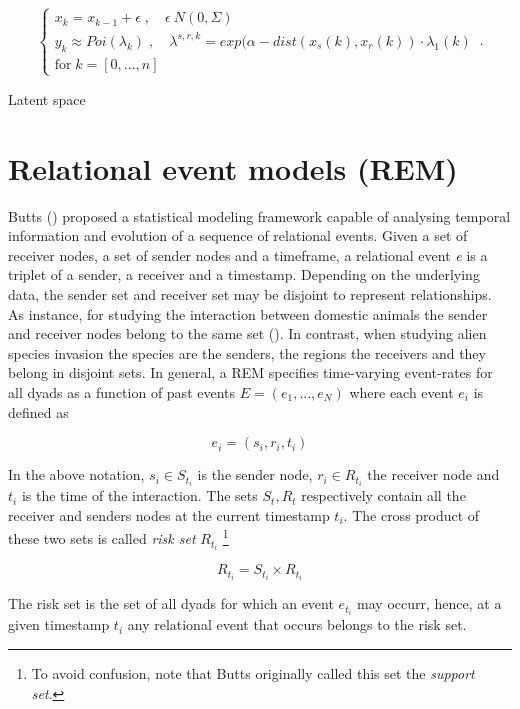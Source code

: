 \documentclass[mscthesis]{usiinfthesis}
\begin{document}
\begin{eqfloat}
\begin{equation}
    \begin{cases}
      x_k = x_{k-1} + \epsilon \; , \quad \epsilon ~ N(0, \Sigma) \\
      y_k \approx Poi(\lambda_k) \; , \quad \lambda^{s, r, k} = exp(\alpha-dist(x_s(k), x_r(k)) \cdot \lambda_1(k) \\
      \textrm{for} \; k = [0, ..., n]
    \end{cases}\,.
\label{eq:latent_randomwalk}
\end{equation}
\caption{Latent space}
\end{eqfloat}


\section{Relational event models (REM)}

Butts (\citet{rem:butts}) proposed a statistical modeling framework capable of analysing temporal information and evolution of a sequence of relational events. Given a set of receiver nodes, a set of sender nodes and a timeframe, a relational event \textit{e} is a triplet of a sender, a receiver and a timestamp. Depending on the underlying data, the sender set and receiver set may be disjoint to represent relationships. As instance, for studying the interaction between domestic animals the sender and receiver nodes belong to the same set (\citep{intro:cattle}). In contrast, when studying alien species invasion the species are the senders, the regions the receivers and they belong in disjoint sets. In general, a REM specifies time-varying event-rates for all dyads as a function of past events $E=(e_1, ..., e_N)$ where each event $e_i$ is defined as

\[
e_i = (s_i, r_i, t_i)
\]

In the above notation, $s_i \in S_{t_i} $ is the sender node, $r_i \in R_{t_i}$ the receiver node and $t_i$ is the time of the interaction. The sets $S_t, R_t$ respectively contain all the receiver and senders nodes at the current timestamp $t_i$. The cross product of these two sets is called \textit{risk set} $R_{t_i}$  \footnote{\label{riskset_footnote}To avoid confusion, note that Butts originally called this set the \textit{support set}.}



\[
R_{t_i} = S_{t_i} \times R_{t_i}
\]

The risk set is the set of all dyads for which an event $e_{t_i}$ may occurr, hence, at a given timestamp $t_i$ any relational event that occurs belongs to the risk set.
\end{document}
